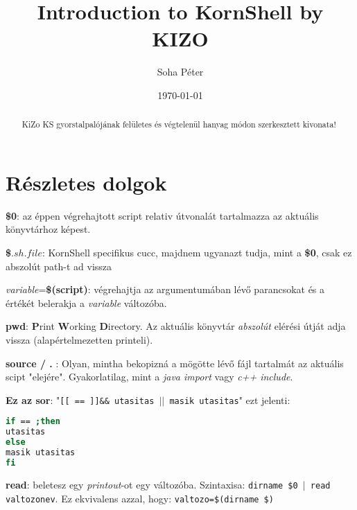 \documentclass{article}
\begin{document}
\title{Introduction to KornShell by KIZO}
\author{Soha Péter}
\date{\today}

\maketitle

\begin{abstract}
KiZo KS gyorstalpalójának felületes és végtelenül hanyag módon szerkesztett kivonata!
\end{abstract}

\section{Részletes dolgok}
\textbf{\$0}: az éppen végrehajtott script relativ útvonalát tartalmazza az aktuális könyvtárhoz képest.\newline

\textbf{\$${.sh.file}$}: KornShell specifikus cucc,  majdnem ugyanazt tudja, mint a \textbf{\$0}, csak ez abszolút path-t ad vissza\newline

\textit{variable}=\textbf{\$(script)}: végrehajtja az argumentumában lévő parancsokat és a értékét belerakja a \textit{variable} változóba.\newline

\textbf{pwd}: \textbf{P}rint \textbf{W}orking \textbf{D}irectory. Az aktuális könyvtár \textit{abszolút} elérési útját adja vissza (alapértelmezetten printeli).\newline

\textbf{source / .} : Olyan, mintha bekopizná a mögötte lévő fájl tartalmát az aktuális scipt "elejére". Gyakorlatilag, mint a \textit{java import} vagy \textit{c++ include}.\newline 

\textbf{Ez az sor}: 
"\texttt{[[ == ]]\&\& utasitas $||$ masik utasitas}" ezt jelenti: 
\begin{lstlisting}[language=bash]
if == ;then
utasitas
else
masik utasitas
fi
\end{lstlisting}

\textbf{read}: beletesz egy \textit{printout}-ot egy változóba. Szintaxisa: \texttt{dirname \$0 $|$ read valtozonev}. Ez ekvivalens azzal, hogy: \texttt{valtozo=\$(dirname \$)}\newline


\newpage
\end{document}
